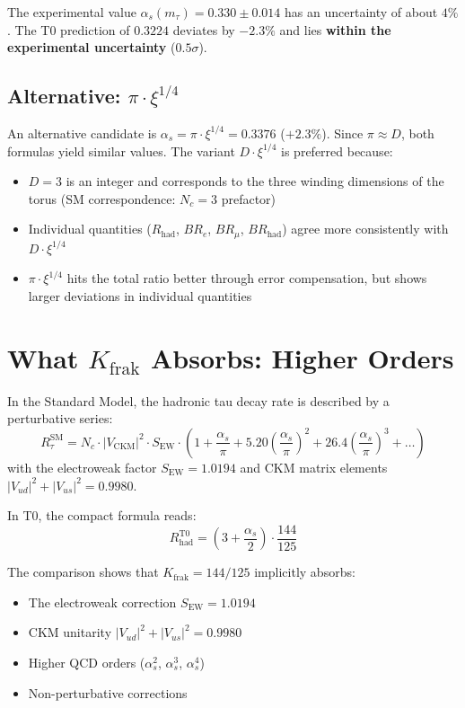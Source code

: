 	The experimental value $\alpha_s(m_\tau) = 0.330 \pm 0.014$ has an uncertainty of about $4\%$. The T0 prediction of $0.3224$ deviates by $-2.3\%$ and lies \textbf{within the experimental uncertainty} ($0.5\sigma$).
	
	\subsection{Alternative: $\pi \cdot \xi^{1/4}$}
	
	An alternative candidate is $\alpha_s = \pi \cdot \xi^{1/4} = 0.3376$ ($+2.3\%$). Since $\pi \approx D$, both formulas yield similar values. The variant $D \cdot \xi^{1/4}$ is preferred because:
	\begin{itemize}
		\item $D = 3$ is an integer and corresponds to the three winding dimensions of the torus (SM correspondence: $N_c=3$ prefactor)
		\item Individual quantities ($R_\text{had}$, $BR_e$, $BR_\mu$, $BR_\text{had}$) agree more consistently with $D \cdot \xi^{1/4}$
		\item $\pi \cdot \xi^{1/4}$ hits the total ratio better through error compensation, but shows larger deviations in individual quantities
	\end{itemize}
	
	
	\section{What $K_\text{frak}$ Absorbs: Higher Orders}
	\label{sec:higher}
	
	In the Standard Model, the hadronic tau decay rate is described by a perturbative series:
	\begin{equation}
		R_\tau^\text{SM} = N_c \cdot |V_\text{CKM}|^2 \cdot S_\text{EW} \cdot \left(1 + \frac{\alpha_s}{\pi} + 5.20 \left(\frac{\alpha_s}{\pi}\right)^2 + 26.4 \left(\frac{\alpha_s}{\pi}\right)^3 + \ldots\right)
	\end{equation}
	with the electroweak factor $S_\text{EW} = 1.0194$ and CKM matrix elements $|V_{ud}|^2 + |V_{us}|^2 = 0.9980$.
	
	In T0, the compact formula reads:
	\begin{equation}
		R_\text{had}^\text{T0} = \left(3 + \frac{\alpha_s}{2}\right) \cdot \frac{144}{125}
	\end{equation}
	
	The comparison shows that $K_\text{frak} = 144/125$ implicitly absorbs:
	\begin{itemize}
		\item The electroweak correction $S_\text{EW} = 1.0194$
		\item CKM unitarity $|V_{ud}|^2 + |V_{us}|^2 = 0.9980$
		\item Higher QCD orders ($\alpha_s^2$, $\alpha_s^3$, $\alpha_s^4$)
		\item Non-perturbative corrections
	\end{itemize}
	
